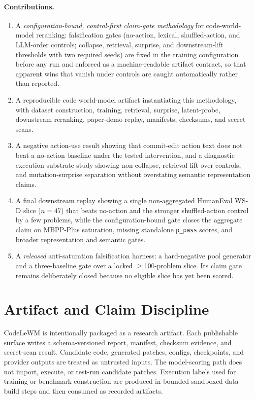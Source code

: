 \documentclass[11pt]{article}
\newcommand{\code}[1]{\texttt{#1}}
\newcommand{\modelname}{CodeLeWM}
\begin{document}
\paragraph{Contributions.}
\begin{enumerate}[leftmargin=1.5em]
  \item A \emph{configuration-bound, control-first claim-gate methodology} for
  code-world-model reranking: falsification gates (no-action, lexical,
  shuffled-action, and LLM-order controls; collapse, retrieval, surprise, and
  downstream-lift thresholds with two required seeds) are fixed in the training
  configuration before any run and enforced as a machine-readable artifact
  contract, so that apparent wins that vanish under controls are caught
  automatically rather than reported.
  \item A reproducible code world-model artifact instantiating this methodology,
  with dataset construction, training, retrieval, surprise, latent-probe,
  downstream reranking, paper-demo replay, manifests, checksums, and secret scans.
  \item A negative action-use result showing that commit-edit action text does
  not beat a no-action baseline under the tested intervention, and a diagnostic
  execution-substrate study showing non-collapse, retrieval lift over controls,
  and mutation-surprise separation without overstating semantic representation
  claims.
  \item A final downstream replay showing a single non-aggregated HumanEval WS-D
  slice ($n=47$) that beats no-action and the stronger shuffled-action control by
  a few problems, while the configuration-bound gate closes the aggregate claim on
  MBPP-Plus saturation, missing standalone \code{p\_pass} scores, and broader
  representation and semantic gates.
  \item A \emph{released} anti-saturation falsification harness: a hard-negative
  pool generator and a three-baseline gate over a locked $\geq$100-problem slice.
  Its claim gate remains deliberately closed because no eligible slice has yet
  been scored.
\end{enumerate}

\section{Artifact and Claim Discipline}

\modelname{} is intentionally packaged as a research artifact. Each publishable
surface writes a schema-versioned report, manifest, checksum evidence, and
secret-scan result. Candidate code, generated patches, configs, checkpoints,
and provider outputs are treated as untrusted inputs. The model-scoring path
does not import, execute, or test-run candidate patches. Execution labels used
for training or benchmark construction are produced in bounded sandboxed data
build steps and then consumed as recorded artifacts.
\end{document}
